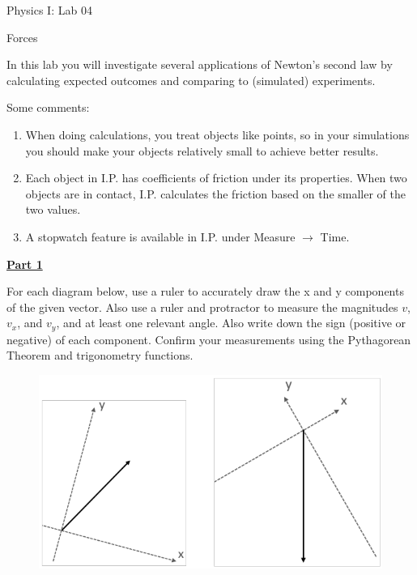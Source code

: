 \documentclass[12pt]{article}
\begin{document}
{\centering
\large Physics I: Lab 04 \par
\large Forces \par
}
\hfill \break \vspace{-4mm}

In this lab you will investigate several applications of Newton's second law by calculating expected outcomes and comparing to (simulated) experiments.

Some comments:
\begin{enumerate}
\item When doing calculations, you treat objects like points, so in your simulations you should make your objects relatively small to achieve better results.
\item Each object in I.P. has coefficients of friction under its properties. When two objects are in contact, I.P. calculates the friction based on the smaller of the two values.
\item A stopwatch feature is available in I.P. under Measure $\rightarrow$ Time.
\end{enumerate}

\underline{\textbf{Part 1}} \par
For each diagram below, use a ruler to accurately draw the x and y components of the given vector.
Also use a ruler and protractor to measure the magnitudes $v$, $v_x$, and $v_y$, and at least one relevant angle.
Also write down the sign (positive or negative) of each component.
Confirm your measurements using the Pythagorean Theorem and trigonometry functions.
%
\begin{figure}[H]
\includegraphics[scale=0.70]{figures/fig1.png}
\end{figure}
\end{document}
